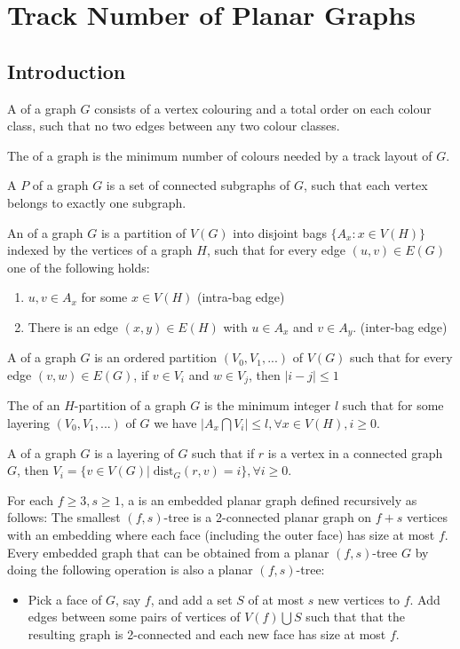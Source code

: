 \documentclass[../main.tex]{subfiles}
\begin{document}
	\section{Track Number of Planar Graphs}
	\subsection{Introduction}
	
	A  of a graph $G$ consists of a vertex colouring and a total order on each colour class, such that no two edges between any two colour classes.
	
	
	The  of a graph is the minimum number of colours needed by a track layout of $G$.
	
	
	A  $P$ of a graph $G$ is a set of connected subgraphs of $G$, such that each vertex belongs to exactly one subgraph.
	
	
	An  of a graph $G$ is a partition of $V(G)$ into disjoint bags $\{A_x: x\in V(H)\}$ indexed by the vertices of a graph $H$, such that for every edge $(u,v)\in E(G)$ one of the following holds: 
	\begin{enumerate}
		\item $u,v \in A_x$ for some $x\in V(H)$ (intra-bag edge)
		\item There is an edge $(x,y) \in E(H)$ with $u\in A_x$ and $v \in A_y$. (inter-bag edge)
	\end{enumerate}
	
	
	A  of a graph $G$ is an ordered partition $(V_0, V_1, ...)$ of $V(G)$ such that for every edge $(v,w)\in E(G)$, if $v\in V_i$ and $w\in V_j$, then $|i-j|\le1$
	
	The  of an $H$-partition of a graph $G$ is the minimum integer $l$ such that for some layering $(V_0, V_1,...)$ of $G$ we have $|A_x\bigcap V_i|\le l, \forall x\in V(H), i\ge0$.
	
	A  of a graph $G$ is a layering of $G$ such that if $r$ is a vertex in a connected graph $G$, then $V_i=\{v \in V(G) |\; \text{dist}_G(r,v)=i\}, \forall i\ge 0$.
	
	For each $f \ge 3, s\ge 1$, a  is an embedded planar graph defined recursively as follows: The smallest $(f,s)$-tree is a 2-connected planar graph on $f+s$ vertices with an embedding where each face (including the outer face) has size at most $f$. Every embedded graph that can be obtained from a planar $(f,s)$-tree $G$ by doing the following operation is also a planar $(f,s)$-tree:
	\begin{itemize}
		\item Pick a face of $G$, say $f$, and add a set $S$ of at most $s$ new vertices to $f$. Add edges between some pairs of vertices of $V(f)\bigcup S$ such that that the resulting graph is 2-connected and each new face has size at most $f$.
	\end{itemize}
	
\end{document}
